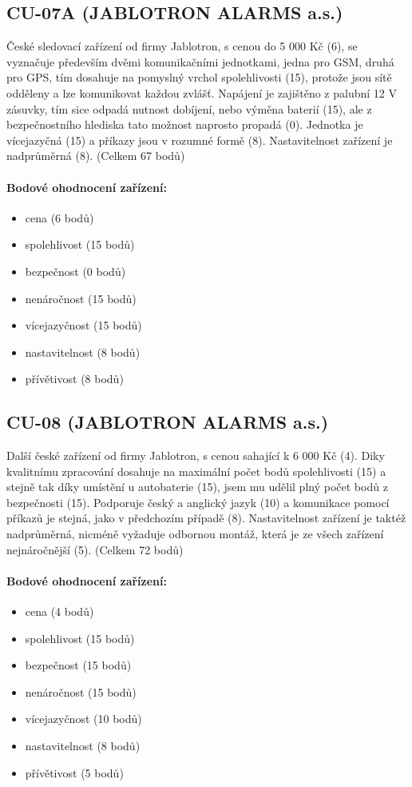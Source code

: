 \documentclass[FM,MP]{tulthesis}  %
\begin{document}
\subsection{CU-07A (JABLOTRON ALARMS a.s.)}
České sledovací zařízení od firmy Jablotron, s cenou do 5 000 Kč (6), se vyznačuje především dvěmi komunikačními jednotkami, jedna pro GSM, druhá pro GPS, tím dosahuje na pomyslný vrchol spolehlivosti (15), protože jsou sítě odděleny a lze komunikovat každou zvlášť. Napájení je zajištěno z palubní 12 V zásuvky, tím sice odpadá nutnost dobíjení, nebo výměna baterií (15), ale z bezpečnostního hlediska tato možnost naprosto propadá (0). Jednotka je vícejazyčná (15) a příkazy jsou v rozumné formě (8). Nastavitelnost zařízení je nadprůměrná (8). (Celkem 67 bodů)

\paragraph{Bodové ohodnocení zařízení:}
\begin{itemize}
\item cena (6 bodů)
\item spolehlivost (15 bodů)
\item bezpečnost (0 bodů)
\item nenáročnost (15 bodů)
\item vícejazyčnost (15 bodů)
\item nastavitelnost (8 bodů)
\item přívětivost (8 bodů)
\end{itemize}

\subsection{CU-08 (JABLOTRON ALARMS a.s.)}
Další české zařízení od firmy Jablotron, s cenou sahající k 6 000 Kč (4). Diky kvalitnímu zpracování dosahuje na maximální počet bodů spolehlivosti (15) a stejně tak díky umístění u autobaterie (15), jsem mu udělil plný počet bodů z bezpečnosti (15). Podporuje český a anglický jazyk (10) a komunikace pomocí příkazů je stejná, jako v předchozím případě (8). Nastavitelnost zařízení je taktéž nadprůměrná, nicméně vyžaduje odbornou montáž, která je ze všech zařízení nejnáročnější (5). (Celkem 72 bodů)

\paragraph{Bodové ohodnocení zařízení:}
\begin{itemize}
\item cena (4 bodů)
\item spolehlivost (15 bodů)
\item bezpečnost (15 bodů)
\item nenáročnost (15 bodů)
\item vícejazyčnost (10 bodů)
\item nastavitelnost (8 bodů)
\item přívětivost (5 bodů)
\end{itemize}
\end{document}
